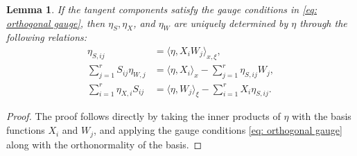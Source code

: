 \documentclass[preprint,11pt]{elsarticle}
\newtheorem{lemma}{Lemma}[section]
\begin{document}
\begin{lemma}
    If the tangent components satisfy the gauge conditions in \eqref{eq: orthogonal gauge}, then $\eta_S, \eta_X$, and $\eta_W$ are uniquely determined by $\eta$ through the following relations:
    \begin{align}
        \eta_{S,ij} &= \langle \eta, X_i W_j \rangle_{x,\xi}, \label{eq: unique S} \\
        \sum_{j=1}^{r} S_{ij} \eta_{W,j} &= \langle \eta, X_i \rangle_{x} - \sum_{j=1}^{r} \eta_{S,ij} W_j, \label{eq: unique W} \\
        \sum_{i=1}^{r} \eta_{X,i} S_{ij} &= \langle \eta, W_j \rangle_{\xi} - \sum_{i=1}^{r} X_i \eta_{S,ij}. \label{eq: unique X}
    \end{align}
\end{lemma}
\begin{proof}
    The proof follows directly by taking the inner products of $\eta$ with the basis functions $X_i$ and $W_j$, and applying the gauge conditions \eqref{eq: orthogonal gauge} along with the orthonormality of the basis.
\end{proof}
\end{document}
